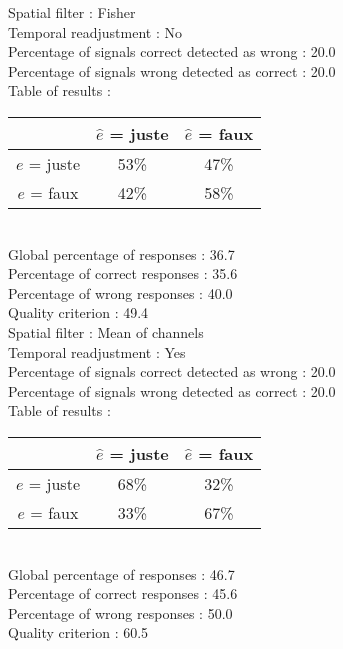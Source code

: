 Spatial filter : Fisher \\
Temporal readjustment : No \\
Percentage of signals correct detected as wrong :   20.0 \\
Percentage of signals wrong detected as correct :   20.0 \\
Table of results : \\
\begin{tabular}{|c|c|c|}
\hline				& $\hat{e}$ = juste & $\hat{e}$ = faux \\
\hline  $e$ = juste	&     53\%			&     47\%		\\
\hline  $e$ = faux	&     42\%			&     58\%		\\
\hline
\end{tabular}\\
Global percentage of responses :   36.7 \\
Percentage of correct responses :   35.6 \\
Percentage of wrong responses :   40.0 \\
Quality criterion :   49.4 \\

Spatial filter : Mean of channels \\
Temporal readjustment : Yes \\
Percentage of signals correct detected as wrong :   20.0 \\
Percentage of signals wrong detected as correct :   20.0 \\
Table of results : \\
\begin{tabular}{|c|c|c|}
\hline				& $\hat{e}$ = juste & $\hat{e}$ = faux \\
\hline  $e$ = juste	&     68\%			&     32\%		\\
\hline  $e$ = faux	&     33\%			&     67\%		\\
\hline
\end{tabular}\\
Global percentage of responses :   46.7 \\
Percentage of correct responses :   45.6 \\
Percentage of wrong responses :   50.0 \\
Quality criterion :   60.5 \\

